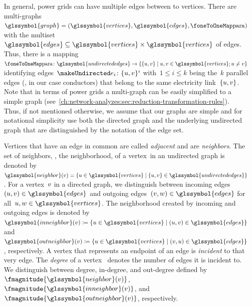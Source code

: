 In general, power grids can have multiple edges between to vertices. There are
multi-graphs~$
  \glssymbol{graph} 
  = 
  (\glssymbol{vertices},\glssymbol{edges},\paralleledgeMap)
$ with the multiset~$
  \glssymbol{edges}
  \subseteq
  \glssymbol{vertices}
  \times
  \glssymbol{vertices}
$ of edges. Thus, there is a mapping~$
  \paralleledgeMap
  \colon
  \glssymbol{undirectededges}
  \to
  \{
    \{\vertexa,\vertexb\}
    \mid 
    \vertexa,
    \vertexb
    \in
    \glssymbol{vertices};
    \vertexa
    \not=
    \vertexb
  \}
$ identifying edges~$
  \undirectededge_i
  \colon
  \{\vertexa,\vertexb\}^i
$ with~$1\leq i\leq k$ being the~$k$ parallel edges (\ie, in our case
conductors) that belong to the same electricity link~$\{u,v\}$.
Note that in terms of power grids a multi-graph can be easily simplified to a
simple graph
(see~\cref{ch:network-analyzes:sec:reduction-transformation-rules}). Thus, if
not mentioned otherwise, we assume that our graphs are simple and for notational
simplicity use both the directed graph and the underlying undirected graph that
are distinguished by the notation of the edge set.

Vertices that have an edge in common are called \emph{adjacent} and are
\emph{neighbors}. The set of neighbors, \ie, the neighborhood, of a
vertex~\vertexb in an undirected graph is denoted by~$
    \glssymbol{neighbor}(\vertexb)
    =
    \{
        \vertexa
        \in
        \glssymbol{vertices}
        \mid
        \{\vertexa,\vertexb\}
        \in
        \glssymbol{undirectededges}
    \}
$. For a vertex~$v$ in a directed graph, we distinguish between incoming
edges~$(\vertexa,\vertexb)\in\glssymbol{edges}$ and outgoing edges~$
(\vertexb,\vertexc)\in\glssymbol{edges}$ for
all~$\vertexa,\vertexc\in\glssymbol{vertices}$. The neighborhood created by
incoming and outgoing edges is denoted by~$
    \glssymbol{inneighbor}(\vertexb)
    \coloneqq 
    \{ 
        \vertexa \in \glssymbol{vertices}
        \mid 
        (\vertexa, \vertexb)
        \in
        \glssymbol{edges} 
    \}
$ and~$
    \glssymbol{outneighbor}(\vertexb)
    \coloneqq 
    \{ 
        \vertexa \in \glssymbol{vertices}
        \mid 
        (\vertexb, \vertexa)
        \in
        \glssymbol{edges} 
    \}
$, respectively. A vertex that represents an endpoint of an edge is
\emph{incident} to that very edge. The \emph{degree} of a vertex~\vertexb
denotes the number of edges it is incident to. We distinguish between degree,
in-degree, and out-degree defined
by~$\fmagnitude{\glssymbol{neighbor}(\vertexb)}$,
$\fmagnitude{\glssymbol{inneighbor}(\vertexb)}$,
and~$\fmagnitude{\glssymbol{outneighbor}(\vertexb)}$, respectively.

